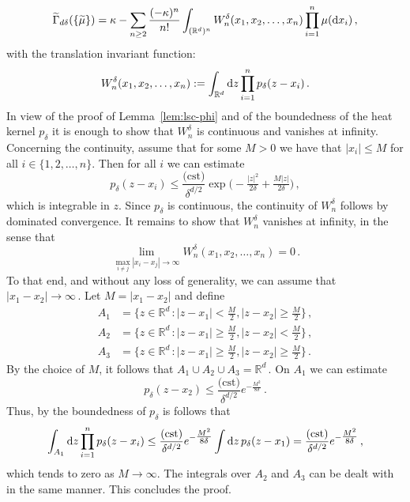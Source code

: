 \documentclass[a4paper,11pt]{amsart}
\numberwithin{equation}{section}
\newcommand{\gk}{\kappa}
\renewcommand{\tilde}{\widetilde}          %
\newcommand{\dd}{\text{\rm d}}             %
\newcommand{\R}{\mathbb{R}}
\newcommand{\8}{\infty}
\newcommand{\beq}{\begin{equation}}
\newcommand{\eeq}{\end{equation}}
\begin{document}
	\beq\label{eq:Gammadeltaexpansion}
	\tilde\Gamma_{ d\delta}(\{\tilde\mu\}) = \gk -\sum_{n\geq 2}\frac{(-\gk)^n}{n!}\int_{(\R^d)^n}W_{n}^{\delta}(x_1,x_2,\ldots, x_n)\prod_{i=1}^{n}\mu(\dd x_i)\,,
	\eeq
with the translation invariant function:
	\beq
	W_{n}^{\delta}(x_1,x_2,\ldots, x_n):=\int_{\R^d}\dd z \prod_{i=1}^{n}p_\delta(z-x_i)\,.
	\eeq
	In view of the proof of Lemma~\ref{lem:lsc-phi} and of the boundedness of the heat kernel $p_\delta$ it is enough to show that $W_n^\delta$ is continuous and vanishes at infinity. Concerning the continuity, assume that for some $M>0$ we have that $|x_i|\leq M$ for all $i\in\{1,2,\ldots,n\}$. Then for all $i$ we can estimate
	\beq
	p_\delta(z-x_i)\le \frac{\textrm{(cst)}}{\delta^{d/2}}\exp\Big(-\tfrac{|z|^2}{2\delta}+\tfrac{M|z|}{2\delta}\Big)\,,
	\eeq
	which is integrable in $z$. Since $p_\delta$ is continuous, the continuity of $W_n^\delta$ follows by dominated convergence.
	It remains to show that $W_n^\delta$ vanishes at infinity, in the sense that
	\beq
	\lim_{\max_{i\neq j}|x_i-x_j|\to\infty} W_n^\delta(x_1,x_2,\ldots, x_n)=0\,.
	\eeq To that end, and without any loss of generality, we can assume that $|x_1-x_2|\to\infty$\,. Let $M=|x_1-x_2|$ and define
	\beq
	\begin{aligned}
		A_1&= \{z\in\R^d\,:|z-x_1|<\tfrac{M}{2}, |z-x_2|\geq \tfrac{M}{2}\}\,,\\
		A_2&=\{z\in\R^d\,:|z-x_1|\geq\tfrac{M}{2}, |z-x_2|< \tfrac{M}{2}\}\,,\\
		A_3&=\{z\in\R^d\,:|z-x_1|\geq\tfrac{M}{2}, |z-x_2|\geq \tfrac{M}{2}\}\,.
	\end{aligned}
	\eeq
	By the choice of $M$, it follows that $A_1\cup A_2\cup A_3=\R^d$\,. On $A_1$ we can estimate
	\beq
	p_\delta(z-x_2)\le \frac{\textrm{(cst)}}{\delta^{d/2}}e^{-\tfrac{M^2}{8\delta}}\,.
	\eeq
	Thus, by the boundedness of $p_\delta$ is follows that
	\beq
	\int_{A_1}\dd z\prod_{i=1}^n p_\delta(z-x_i)\le  \frac{\textrm{(cst)}}{\delta^{d/2}}e^{-\tfrac{M^2}{8\delta}}\int\dd z\, p_\delta(z-x_1)=\frac{\textrm{(cst)}}{\delta^{d/2}}e^{-\tfrac{M^2}{8\delta}}\,,
	\eeq
	which tends to zero as $M\to\infty$. The integrals over $A_2$ and $A_3$ can be dealt with in the same manner. This concludes the proof.
%
\end{document}

